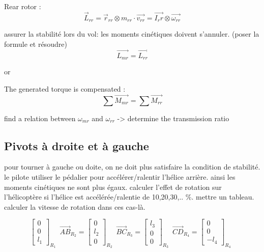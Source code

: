 \documentclass[12pt,a4paper]{article}
\begin{document}
	
	Rear rotor : 
	\begin{equation}
		\vec{L}_{rr}=\vec{r}_{rr} \otimes m_{rr} \cdot \vec{v_{rr}}=\vec{I_rr} \otimes \vec{\omega_{rr}}
	\end{equation}
	
	assurer la stabilité lors du vol: les moments cinétiques doivent s'annuler. (poser la formule et résoudre)
	\begin{equation}
		\vec{L_{mr}}=\vec{L_{rr}}
	\end{equation}
	
	or
	
	The generated torque is compensated : 
	\begin{equation}
		\sum \vec{M_{mr}}=\sum \vec{M_{rr}}
	\end{equation}
	
	find a relation between $\omega_{mr}$ and $\omega_{rr}$ -> determine the transmission ratio
	
	\subsection{Pivots à droite et à gauche}
	pour tourner à gauche ou doite, on ne doit plus satisfaire la condition de stabilité. le pilote utiliser le pédalier pour accélérer/ralentir l'hélice arrière. ainsi les moments cinétiques ne sont plus égaux.
	\medbreak
	calculer l'effet de rotation sur l'hélicoptère si l'hélice est accélérée/ralentie de 10,20,30,.. $\%$. mettre un tableau. calculer la vitesse de rotation dans ces cas-là. 
	
	
	\begin{equation}
		\begin{bmatrix}
			0 \\
			0\\
			l_1
		\end{bmatrix}_{R_{1}} \enspace
		\vec{AB}_{R_{2}}=
		\begin{bmatrix}
			0 \\
			l_2\\
			0
		\end{bmatrix}_{R_{2}} \enspace
		\vec{BC}_{R_{3}}=
		\begin{bmatrix}
			l_3 \\
			0\\
			0
		\end{bmatrix}_{R_{3}} \enspace
		\vec{CD}_{R_{4}}=
		\begin{bmatrix}
			0 \\
			0\\
			-l_4
		\end{bmatrix}_{R_{4}} \enspace
	\end{equation}
	
\end{document}
